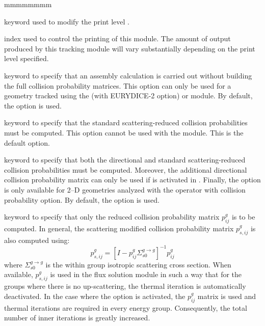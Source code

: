 \begin{ListeDeDescription}{mmmmmmmm}

\item[\moc{EDIT}] keyword used to modify the print level .

\item[\dusa{iprint}] index used to control the printing of this module. The
amount of output produced by this tracking module will vary substantially
depending on the print level specified. 

\item[\moc{ARM}] keyword to specify that an
assembly calculation is carried out without building the full collision
probability matrices. This option can only be used for a geometry tracked using
the  (with EURYDICE-2 option) or  module. By default, the 
option is used.

\item[\moc{PIJ}] keyword to specify that the standard scattering-reduced collision
probabilities must be computed. This option cannot be used with the 
module. This is the default option.

\item[\moc{PIJK}] keyword to specify that both the directional and standard
scattering-reduced collision probabilities must be computed. Moreover, the additional directional
collision probability matrix can only be used if  is activated in
. Finally, the 
option is only available for 2--D geometries analyzed with the operator
 with collision probability option. By default, the 
option is used.

\item[\moc{SKIP}] keyword to specify that only the reduced collision
probability matrix $p^{g}_{ij}$ is to be computed. In general, the scattering
modified collision probability matrix $p^{g}_{s,ij}$ is also computed using:
  $$
p^{g}_{s,ij}=\left[ I-p^{g}_{ij} \Sigma^{g\to g}_{s0} \right] ^{-1}
p^{g}_{ij}
  $$
where $\Sigma^{g\to g}_{s0}$ is the within group isotropic scattering cross
section. When available, $p^{g}_{s,ij}$ is used in the flux solution module in
such a way that for the groups where there is no up-scattering, the thermal
iteration is automatically deactivated. In the case where the  option
is activated, the $p^{g}_{ij}$ matrix is used and thermal iterations are
required in every energy group. Consequently, the total number of inner
iterations is greatly increased.


\end{ListeDeDescription}
